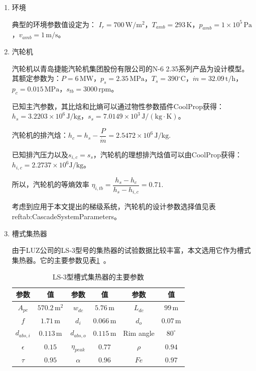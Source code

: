 \begin{enumerate}[label=(\arabic*)]

\item 环境

典型的环境参数值设定为：
$I_r = 700\,\mathrm{W/m^2}$，$T_{amb} = 293\,\mathrm{K}$，$p_{amb} = 1\times10^5\,\mathrm{Pa}$，$v_{amb} = 1\,\mathrm{m/s}$。

\item 汽轮机

汽轮机以青岛捷能汽轮机集团股份有限公司的N-6 2.35系列产品为设计模型。其额定参数为：$P = 6\,\mathrm{MW}$，$p_s = 2.35\,\mathrm{MPa}$，$T_s = 390\mathrm{^\circ C}$，$\dot{m} = 32.09\,\mathrm{t/h}$，$p_c = 0.015\,\mathrm{MPa}$，$s_{tb} = 3000\,\mathrm{rpm}$。
	
	已知主汽参数，其比焓和比熵可以通过物性参数插件CoolProp获得：$h_s = 3.2203\times10^6\,\mathrm{J/kg}$，$s_s = 7.0149\times10^3\,\mathrm{J/(kg\cdot K)}$。
	
	汽轮机的排汽焓：$h_{c} = h_{s} - \dfrac{P}{\dot{m}} = 2.5472\times10^6\,\mathrm{J/kg}$.
	
	已知排汽压力以及$s_{i,c} = s_s$，汽轮机的理想排汽焓值可以由CoolProp获得：$h_{i,c} = 2.2737\times10^6\mathrm{J/kg}$。
	
	所以，汽轮机的等熵效率
	$\eta_{i,tb} = \dfrac{h_s - h_c}{h_{s} - h_{i,c}} = 0.71$.
	
	考虑到应用于本文提出的梯级系统，汽轮机的设计参数选择值见表ref{tab:CascadeSystemParameters}。
		 
\item 槽式集热器

由于LUZ公司的LS-3型号的集热器的试验数据比较丰富，本文选用它作为槽式集热器。它的主要参数见表\ref{tab:TroughParameters}~\cite{Fernandez2010}。

\begin{table}[htbp]
	\caption{LS-3型槽式集热器的主要参数}
	\begin{center}
	\begin{tabular}{cccccc}
		\toprule
		参数		&	值	&	参数		&	值	&	参数		&	值\\
		\midrule
		$A_{pc}$		&	$570.2\,\mathrm{m^2}$	&	$w_{dc}$	&	$5.76\,\mathrm{m}$	&	$L_{dc}$	&	$99\,\mathrm{m}$\\
		$f$	&	$1.71\,\mathrm{m}$	&	$d_i$		&	$0.066\,\mathrm{m}$	&	$d_o$	&	$0.07\,\mathrm{m}$\\
		$d_{abs,i}$	&	$0.113\,\mathrm{m}$	&	$d_{abs,o}$	&	$0.115\,\mathrm{m}$	&	Rim angle	&	$80^\circ$\\
		$\epsilon$		&	$0.15$	&	$\eta_{peak}$	&	$0.77$	&	$\rho$	&	$0.94$\\
		$\tau$	&	$0.95$	&	
$\alpha$	&	$0.96$	&	$Fe$	&	$0.97$\\
		\bottomrule
	\end{tabular}
	\end{center}
	\label{tab:TroughParameters}
\end{table}


\end{enumerate}
